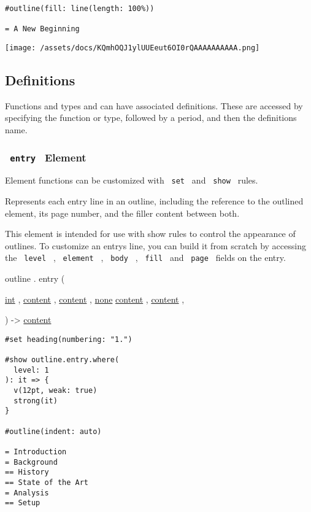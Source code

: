 \begin{verbatim}
#outline(fill: line(length: 100%))

= A New Beginning
\end{verbatim}

\texttt{[image: /assets/docs/KQmhOQJ1ylUUEeut6OI0rQAAAAAAAAAA.png]}

\subsection{\texorpdfstring{{ Definitions
}}{ Definitions }}\label{definitions}

\label{definitions-tooltip}
Functions and types and can have associated definitions. These are
accessed by specifying the function or type, followed by a period, and
then the definition\textquotesingle s name.

\subsubsection{\texorpdfstring{\texttt{\ entry\ } {{ Element
}}}{ entry   Element }}\label{definitions-entry}

\label{definitions-entry-element-tooltip}
Element functions can be customized with \texttt{\ set\ } and
\texttt{\ show\ } rules.

Represents each entry line in an outline, including the reference to the
outlined element, its page number, and the filler content between both.

This element is intended for use with show rules to control the
appearance of outlines. To customize an entry\textquotesingle s line,
you can build it from scratch by accessing the \texttt{\ level\ } ,
\texttt{\ element\ } , \texttt{\ body\ } , \texttt{\ fill\ } and
\texttt{\ page\ } fields on the entry.

outline { . } { entry } (

{ \href{/docs/reference/foundations/int/}{int} , } {
\href{/docs/reference/foundations/content/}{content} , } {
\href{/docs/reference/foundations/content/}{content} , } {
\href{/docs/reference/foundations/none/}{none}
\href{/docs/reference/foundations/content/}{content} , } {
\href{/docs/reference/foundations/content/}{content} , }

) -\textgreater{} \href{/docs/reference/foundations/content/}{content}

\begin{verbatim}
#set heading(numbering: "1.")

#show outline.entry.where(
  level: 1
): it => {
  v(12pt, weak: true)
  strong(it)
}

#outline(indent: auto)

= Introduction
= Background
== History
== State of the Art
= Analysis
== Setup
\end{verbatim}

